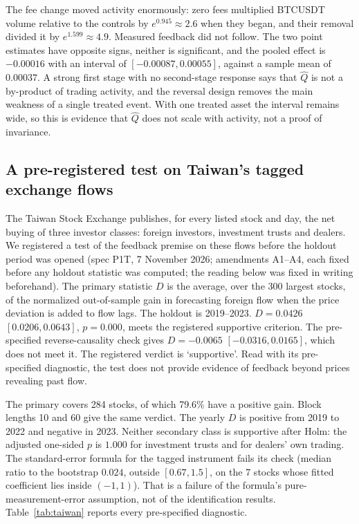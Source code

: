 The fee change moved activity enormously: zero fees multiplied BTCUSDT volume relative to the controls by $e^{0.945}\approx2.6$ when they began, and their removal divided it by $e^{1.599}\approx4.9$. Measured feedback did not follow. The two point estimates have opposite signs, neither is significant, and the pooled effect is $-0.00016$ with an interval of $[-0.00087,0.00055]$, against a sample mean of $0.00037$. A strong first stage with no second-stage response says that $\hat Q$ is not a by-product of trading activity, and the reversal design removes the main weakness of a single treated event. With one treated asset the interval remains wide, so this is evidence that $\hat Q$ does not scale with activity, not a proof of invariance.

\subsection{A pre-registered test on Taiwan's tagged exchange flows}\label{sec:taiwan}
The Taiwan Stock Exchange publishes, for every listed stock and day, the net buying of three investor classes: foreign investors, investment trusts and dealers. We registered a test of the feedback premise on these flows before the holdout period was opened (spec P1T, 7 November 2026; amendments A1--A4, each fixed before any holdout statistic was computed; the reading below was fixed in writing beforehand). The primary statistic $D$ is the average, over the 300 largest stocks, of the normalized out-of-sample gain in forecasting foreign flow when the price deviation is added to flow lags. The holdout is 2019--2023. $D=0.0426$ $[0.0206, 0.0643]$, $p=0.000$, meets the registered supportive criterion. The pre-specified reverse-causality check gives $D=-0.0065$ $[-0.0316, 0.0165]$, which does not meet it. The registered verdict is `supportive'. Read with its pre-specified diagnostic, the test does not provide evidence of feedback beyond prices revealing past flow.

The primary covers 284 stocks, of which 79.6\% have a positive gain. Block lengths 10 and 60 give the same verdict. The yearly $D$ is positive from 2019 to 2022 and negative in 2023. Neither secondary class is supportive after Holm: the adjusted one-sided $p$ is $1.000$ for investment trusts and for dealers' own trading. The standard-error formula for the tagged instrument fails its check (median ratio to the bootstrap $0.024$, outside $[0.67,1.5]$, on the 7 stocks whose fitted coefficient lies inside $(-1,1)$). That is a failure of the formula's pure-measurement-error assumption, not of the identification results. Table~\ref{tab:taiwan} reports every pre-specified diagnostic.

